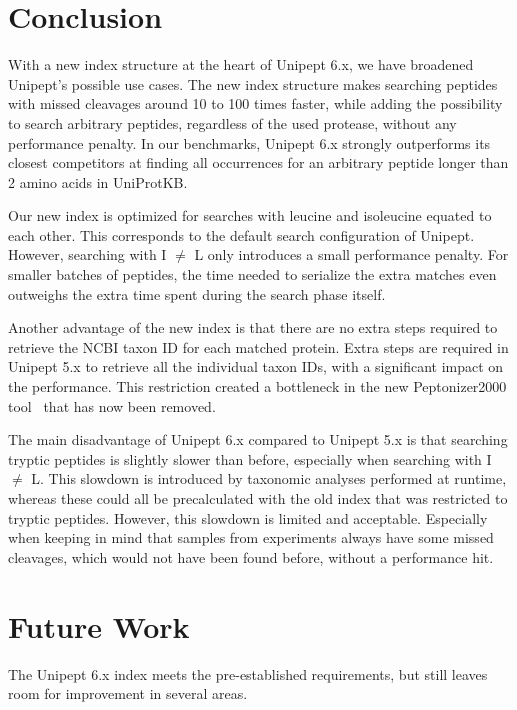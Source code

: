 \documentclass[11pt]{article}
\begin{document}
\begin{multicols}{2}
        \section{Conclusion}\label{sec:discussion}
        With a new index structure at the heart of Unipept 6.x, we have broadened Unipept's possible use cases.
        The new index structure makes searching peptides with missed cleavages around 10 to 100 times faster, while adding the possibility to search arbitrary peptides, regardless of the used protease, without any performance penalty.
        In our benchmarks, Unipept 6.x strongly outperforms its closest competitors at finding all occurrences for an arbitrary peptide longer than 2 amino acids in UniProtKB\@.

        Our new index is optimized for searches with leucine and isoleucine equated to each other.
        This corresponds to the default search configuration of Unipept.
        However, searching with I $\neq$ L only introduces a small performance penalty.
        For smaller batches of peptides, the time needed to serialize the extra matches even outweighs the extra time spent during the search phase itself.

        Another advantage of the new index is that there are no extra steps required to retrieve the NCBI taxon ID for each matched protein.
        Extra steps are required in Unipept 5.x to retrieve all the individual taxon IDs, with a significant impact on the performance.
        This restriction created a bottleneck in the new Peptonizer2000 tool~\cite{pep_gm} that has now been removed.

        The main disadvantage of Unipept 6.x compared to Unipept 5.x is that searching tryptic peptides is slightly slower than before, especially when searching with I $\neq$ L\@.
        This slowdown is introduced by taxonomic analyses performed at runtime, whereas these could all be precalculated with the old index that was restricted to tryptic peptides.
        However, this slowdown is limited and acceptable.
        Especially when keeping in mind that samples from experiments always have some missed cleavages, which would not have been found before, without a performance hit.

        \section{Future Work}
        The Unipept 6.x index meets the pre-established requirements, but still leaves room for improvement in several areas.


\end{multicols}
\end{document}
